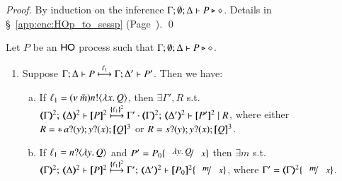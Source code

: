 \begin{proof}
	By induction on the inference $\Gamma; \emptyset; \Delta \proves P \hastype \Proc$. 
	Details in \S~\ref{app:enc:HOp_to_sessp}
	(Page~\pageref{app:enc:HOp_to_sessp}).
	\qed
\end{proof}

\begin{proposition}\rm
	Let $P$ be an  $\HO$ process such that  $\Gamma; \emptyset; \Delta \proves P \hastype \Proc$.
	
	\begin{enumerate}[1.]
	\item Suppose $\stytra{\Gamma}{\ell_1}{\Delta}{P}{\Delta'}{P'}$.
	Then we have:
	\begin{enumerate}[a)]
		\item	 
			If  $\ell_1 = \news{\tilde{m}}\bactout{n}{\abs{x}Q}$,
			then $\exists \Gamma', R$ s.t. \\
			$\mapt{\Gamma}^{2};\, \mapt{\Delta}^{2} \proves  \map{P}^{2} 
			\hby{\mapa{\ell_1}^{2}}
			\Gamma' \cdot \mapt{\Gamma}^{2};\, \mapt{\Delta'}^{2} \proves \map{P'}^{2} \Par R$, 
			where either \\
			$R = \repl{} \binp{a}{y} \binp{y}{x} \pmap{Q}{3}$ 
			or $ R = \binp{s}{y} \binp{y}{x} \pmap{Q}{3}$.
		   


		\item	 
			If  %
			$\ell_1 = \bactinp{n}{\abs{y}Q}$
			and $P' = P_0\subst{\abs{y}Q}{x}$
			then $\exists m$ s.t. \\
			$\mapt{\Gamma}^{2};\, \mapt{\Delta}^{2} \proves \map{P}^{2} 
			\hby{\mapa{\ell_1}^{2}}
			\Gamma';\, \mapt{\Delta'}^{2} \proves  \map{P_0}^{2}\subst{m}{x}$, 
			where $\Gamma' = \mapt{\Gamma}^{2}\subst{m}{x}$.



\end{enumerate}
\end{enumerate}
\end{proposition}

